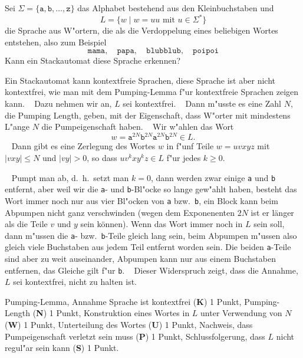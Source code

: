 Sei $\Sigma=\{\texttt{a},\texttt{b},\dots,\texttt{z}\}$ das Alphabet
bestehend aus den Kleinbuchstaben und 
\[
L=\{ w\;|\; \text{$w=uu$ mit $u\in\Sigma^*$}\}
\]
die Sprache aus W"ortern, die als die Verdoppelung eines beliebigen
Wortes entstehen, also zum Beispiel
\[
\texttt{mama},\quad
\texttt{papa},\quad
\texttt{blubblub},\quad
\texttt{poipoi}
\]
Kann ein Stackautomat diese Sprache erkennen?





\begin{loesung}
Ein Stackautomat kann kontextfreie Sprachen, diese Sprache ist aber nicht
kontextfrei, wie man mit dem Pumping-Lemma f"ur kontextfreie
Sprachen zeigen kann.
~%
Dazu nehmen wir an, $L$ sei kontextfrei.
~%
Dann m"usste es eine Zahl $N$, die Pumping Length, geben, mit der Eigenschaft,
dass W"orter mit mindestens L"ange $N$ die Pumpeigenschaft haben.
~%
Wir w"ahlen das Wort
\[
w=
\texttt{a}^{2N}
\texttt{b}^{2N}
\texttt{a}^{2N}
\texttt{b}^{2N}
\in L.
\]
~%
Dann gibt es eine Zerlegung des Wortes $w$ in f"unf Teile $w=uvxyz$ mit
$|vxy|\le N$ und $|vy|>0$, so dass $uv^kxy^kz\in L$ f"ur jedes $k\ge 0$.

~%
Pumpt man ab, d.~h.~setzt man $k=0$, dann werden zwar einige \texttt{a}
und \texttt{b} entfernt, aber weil wir die \texttt{a}- und \texttt{b}-Bl"ocke
so lange gew"ahlt haben, besteht das Wort immer noch nur aus
vier Bl"ocken von \texttt{a} bzw.~\texttt{b}, ein Block kann beim
Abpumpen nicht ganz verschwinden (wegen dem Exponenenten $2N$ ist er
länger als die Teile $v$ und $y$ sein können).
Wenn das Wort immer noch in $L$ sein soll, dann m"ussen die \texttt{a}-
bzw.~\texttt{b}-Teile gleich lang sein, beim Abpumpen m"ussen also
gleich viele Buchstaben aus jedem Teil entfernt worden sein.
Die beiden \texttt{a}-Teile sind aber zu weit auseinander, Abpumpen
kann nur aus einem Buchstaben entfernen, das Gleiche gilt f"ur \texttt{b}.
~%
Dieser Widerspruch zeigt, dass die Annahme, $L$ sei kontextfrei, nicht
zu halten ist.
\end{loesung}

\begin{bewertung}
Pumping-Lemma, Annahme Sprache ist kontextfrei ({\bf K}) 1 Punkt,
Pumping-Length ({\bf N}) 1 Punkt,
Konstruktion eines Wortes in $L$ unter Verwendung von $N$ ({\bf W}) 1 Punkt,
Unterteilung des Wortes ({\bf U}) 1 Punkt,
Nachweis, dass Pumpeigenschaft verletzt sein muss ({\bf P}) 1 Punkt,
Schlussfolgerung, dass $L$ nicht regul"ar sein kann ({\bf S}) 1 Punkt.
\end{bewertung}





